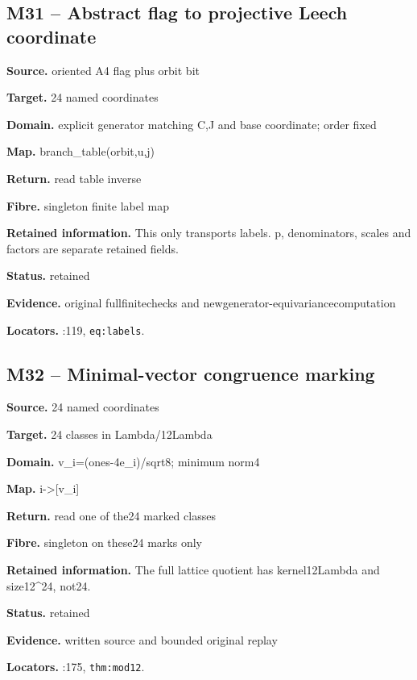 \subsection*{M31 -- Abstract flag to projective Leech coordinate}
\noindent\textbf{Source.} oriented A4 flag plus orbit bit\par
\noindent\textbf{Target.} 24 named coordinates\par
\noindent\textbf{Domain.} explicit generator matching C,J and base coordinate; order fixed\par
\noindent\textbf{Map.} branch\_table(orbit,u,j)\par
\noindent\textbf{Return.} read table inverse\par
\noindent\textbf{Fibre.} singleton finite label map\par
\noindent\textbf{Retained information.} This only transports labels. p, denominators, scales and factors are separate retained fields.\par
\noindent\textbf{Status.} retained\par
\noindent\textbf{Evidence.} original fullfinitechecks and newgenerator-equivariancecomputation\par
\noindent\textbf{Locators.} :119, \texttt{eq:labels}.
\subsection*{M32 -- Minimal-vector congruence marking}
\noindent\textbf{Source.} 24 named coordinates\par
\noindent\textbf{Target.} 24 classes in Lambda/12Lambda\par
\noindent\textbf{Domain.} v\_i=(ones-4e\_i)/sqrt8; minimum norm4\par
\noindent\textbf{Map.} i->[v\_i]\par
\noindent\textbf{Return.} read one of the24 marked classes\par
\noindent\textbf{Fibre.} singleton on these24 marks only\par
\noindent\textbf{Retained information.} The full lattice quotient has kernel12Lambda and size12\textasciicircum{}24, not24.\par
\noindent\textbf{Status.} retained\par
\noindent\textbf{Evidence.} written source and bounded original replay\par
\noindent\textbf{Locators.} :175, \texttt{thm:mod12}.

